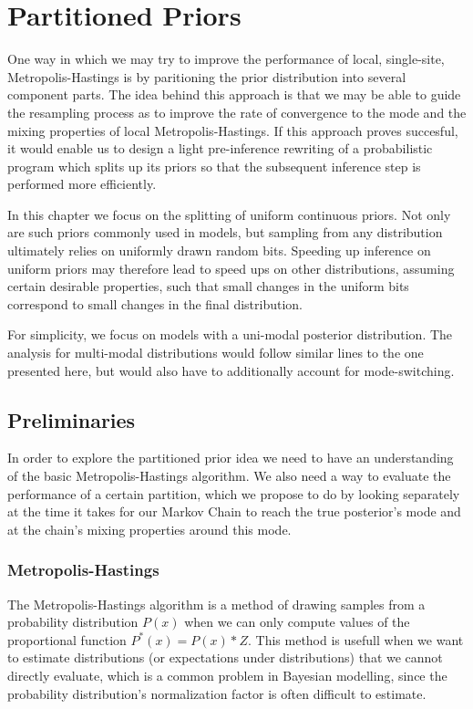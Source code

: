 \chapter{Partitioned Priors}

One way in which we may try to improve the performance of local, single-site, Metropolis-Hastings is by paritioning the prior distribution into several component parts. The idea behind this approach is that we may be able to guide the resampling process as to improve the rate of convergence to the mode and the mixing properties of local Metropolis-Hastings.  If this approach proves succesful, it would enable us to design a light pre-inference rewriting of a probabilistic program which splits up its priors so that the subsequent inference step is performed more efficiently.

In this chapter we focus on the splitting of uniform continuous priors. Not only are such priors commonly used in models, but sampling from any distribution ultimately relies on uniformly drawn random bits. Speeding up inference on uniform priors may therefore lead to speed ups on other distributions, assuming certain desirable properties, such that small changes in the uniform bits correspond to small changes in the final distribution. 

For simplicity, we focus on models with a uni-modal posterior distribution. The analysis for multi-modal distributions would follow similar lines to the one presented here, but would also have to additionally account for mode-switching.

\section{Preliminaries}

In order to explore the partitioned prior idea we need to have an understanding of the basic Metropolis-Hastings algorithm. We also need a way to evaluate the performance of a certain partition, which we propose to do by looking separately at the time it takes for our Markov Chain to reach the true posterior's mode and at the chain's mixing properties around this mode.

\subsection{Metropolis-Hastings}
The Metropolis-Hastings algorithm is a method of drawing samples from a probability distribution $P(x)$ when we can only compute values of the proportional function $P^*(x) = P(x)*Z$. This method is usefull when we want to estimate distributions (or expectations under distributions) that we cannot directly evaluate, which is a common problem in Bayesian modelling, since the probability distribution's normalization factor is often difficult to estimate.

